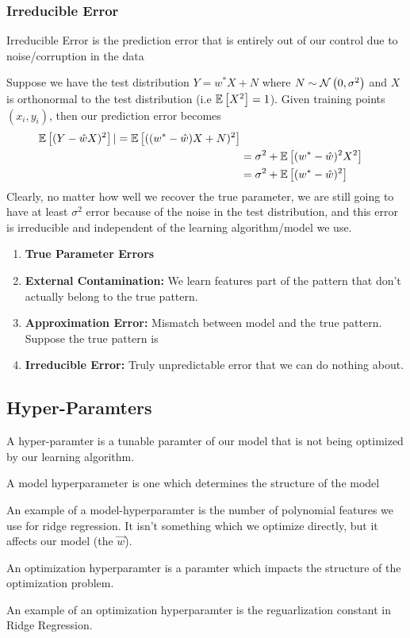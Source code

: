 \subsubsection{Irreducible Error}
\begin{definition}
  Irreducible Error is the prediction error that is entirely out of our control due to noise/corruption in the data
\end{definition}
Suppose we have the test distribution $Y = w^*X + N$ where $N\sim\mathcal{N}\left(0, \sigma^2\right)$ and $X$ is orthonormal to the test distribution (i.e $\mathbb{E}\left[X^2\right] = 1$).
Given training points $(x_i, y_i)$, then our prediction error becomes
\begin{align*}
  \mathbb{E}\left[(Y-\hat{w}X)^2\right] |= \mathbb{E}\left[((w^*-\hat{w})X+N)^2\right] \\
  &= \sigma^2 + \mathbb{E}\left[(w^*-\hat{w})^2X^2\right]\\
  &= \sigma^2 + \mathbb{E}\left[(w^*-\hat{w})^2\right]
\end{align*}
Clearly, no matter how well we recover the true parameter, we are still going to have at least $\sigma^2$ error because of the noise in the test distribution, and this error is irreducible and independent of the learning algorithm/model we use.
\begin{enumerate}
  \item \textbf{True Parameter Errors}
  \item \textbf{External Contamination:} We learn features part of the pattern that don't actually belong to the true pattern.
  \item \textbf{Approximation Error:} Mismatch between model and the true pattern. Suppose the true pattern is
  \item \textbf{Irreducible Error:} Truly unpredictable error that we can do nothing about.
\end{enumerate}
\subsection{Hyper-Paramters}
\begin{definition}
  A hyper-paramter is a tunable paramter of our model that is not being optimized by our learning algorithm.
  \label{defn:hyperparameter}
\end{definition}
\begin{definition}
  A model hyperparameter is one which determines the structure of the model
  \label{defn:model-hyperparameter}
\end{definition}
An example of a model-hyperparamter is the number of polynomial features we use for ridge regression. It isn't something which we optimize directly, but it affects our model (the $\vec{w}$).
\begin{definition}
  An optimization hyperparamter is a paramter which impacts the structure of the optimization problem.
  \label{defn:optim-hyperparamter}
\end{definition}
An example of an optimization hyperparamter is the reguarlization constant in Ridge Regression.
